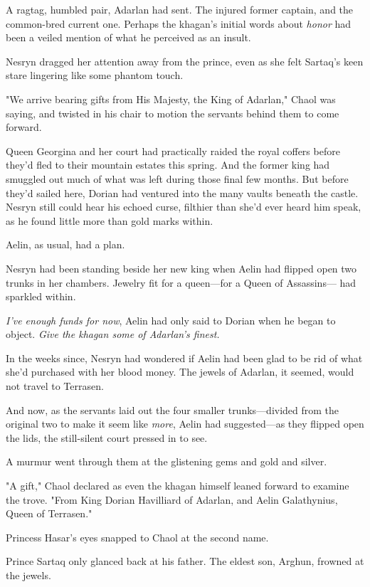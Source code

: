A ragtag, humbled pair, Adarlan had sent.
The injured former captain, and the common-bred current one.
Perhaps the khagan's initial words about \emph{honor} had been a veiled mention of what he perceived as an insult.

Nesryn dragged her attention away from the prince, even as she felt Sartaq's keen stare lingering like some phantom touch.

"We arrive bearing gifts from His Majesty, the King of Adarlan," Chaol was saying, and twisted in his chair to motion the servants behind them to come forward.

Queen Georgina and her court had practically raided the royal coffers before they'd fled to their mountain estates this spring.
And the former king had smuggled out much of what was left during those final few months.
But before they'd sailed here, Dorian had ventured into the many vaults beneath the castle.
Nesryn still could hear his echoed curse, filthier than she'd ever heard him speak, as he found little more than gold marks within.

Aelin, as usual, had a plan.

Nesryn had been standing beside her new king when Aelin had flipped open two trunks in her chambers.
Jewelry fit for a queen---for a Queen of Assassins--- had sparkled within.

\emph{I've enough funds for now}, Aelin had only said to Dorian when he began to object.
\emph{Give the khagan some of Adarlan's finest.}

In the weeks since, Nesryn had wondered if Aelin had been glad to be rid of what she'd purchased with her blood money.
The jewels of Adarlan, it seemed, would not travel to Terrasen.

And now, as the servants laid out the four smaller trunks---divided from the original two to make it seem like \emph{more}, Aelin had suggested---as they flipped open the lids, the still-silent court pressed in to see.

A murmur went through them at the glistening gems and gold and silver.

"A gift," Chaol declared as even the khagan himself leaned forward to examine the trove.
"From King Dorian Havilliard of Adarlan, and Aelin Galathynius, Queen of Terrasen."

Princess Hasar's eyes snapped to Chaol at the second name.

Prince Sartaq only glanced back at his father.
The eldest son, Arghun, frowned at the jewels.

